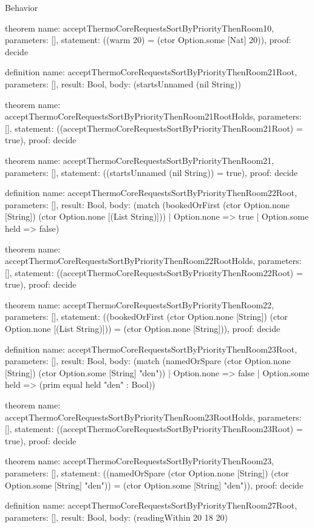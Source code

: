 \begin{lexlean}{Behavior}
\begin{semanticmodule}
theorem{
  name: acceptThermoCoreRequestsSortByPriorityThenRoom10,
  parameters: [],
  statement: ((warm 20) = (ctor Option.some [Nat] 20)),
  proof: decide{}
}

definition{
  name: acceptThermoCoreRequestsSortByPriorityThenRoom21Root,
  parameters: [],
  result: Bool,
  body: (startsUnnamed (nil String))
}

theorem{
  name: acceptThermoCoreRequestsSortByPriorityThenRoom21RootHolds,
  parameters: [],
  statement: ((acceptThermoCoreRequestsSortByPriorityThenRoom21Root) = true),
  proof: decide{}
}

theorem{
  name: acceptThermoCoreRequestsSortByPriorityThenRoom21,
  parameters: [],
  statement: ((startsUnnamed (nil String)) = true),
  proof: decide{}
}

definition{
  name: acceptThermoCoreRequestsSortByPriorityThenRoom22Root,
  parameters: [],
  result: Bool,
  body: (match (bookedOrFirst (ctor Option.none [String]) (ctor Option.none [(List String)]))
    | Option.none => true
    | Option.some held => false)
}

theorem{
  name: acceptThermoCoreRequestsSortByPriorityThenRoom22RootHolds,
  parameters: [],
  statement: ((acceptThermoCoreRequestsSortByPriorityThenRoom22Root) = true),
  proof: decide{}
}

theorem{
  name: acceptThermoCoreRequestsSortByPriorityThenRoom22,
  parameters: [],
  statement: ((bookedOrFirst (ctor Option.none [String]) (ctor Option.none [(List String)])) = (ctor Option.none [String])),
  proof: decide{}
}

definition{
  name: acceptThermoCoreRequestsSortByPriorityThenRoom23Root,
  parameters: [],
  result: Bool,
  body: (match (namedOrSpare (ctor Option.none [String]) (ctor Option.some [String] "den"))
    | Option.none => false
    | Option.some held => (prim equal held "den" : Bool))
}

theorem{
  name: acceptThermoCoreRequestsSortByPriorityThenRoom23RootHolds,
  parameters: [],
  statement: ((acceptThermoCoreRequestsSortByPriorityThenRoom23Root) = true),
  proof: decide{}
}

theorem{
  name: acceptThermoCoreRequestsSortByPriorityThenRoom23,
  parameters: [],
  statement: ((namedOrSpare (ctor Option.none [String]) (ctor Option.some [String] "den")) = (ctor Option.some [String] "den")),
  proof: decide{}
}

definition{
  name: acceptThermoCoreRequestsSortByPriorityThenRoom27Root,
  parameters: [],
  result: Bool,
  body: (readingWithin 20 18 20)
}


\end{semanticmodule}
\end{lexlean}
